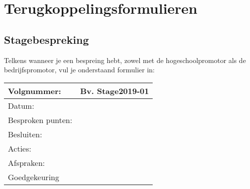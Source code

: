 \documentclass[a4paper]{article}
\begin{document}
  \section{Terugkoppelingsformulieren}
    \subsection{Stagebespreking}
      Telkens wanneer je een bespreing hebt, zowel met de hogeschoolpromotor als
      de bedrijfspromotor, vul je onderstaand formulier in:\par
      \begin{tabularx}{\textwidth}{| l | X |}
        \hline
        Volgnummer: & Bv. Stage2019-01\\
        \hline
        Datum: & \\
        \hline
        Besproken punten: & \\
        \hline
        Besluiten: & \\
        Acties: & \\
        Afspraken: & \\
        \hline
        Goedgekeuring & \\
        \hline
      \end{tabularx}
\end{document}
